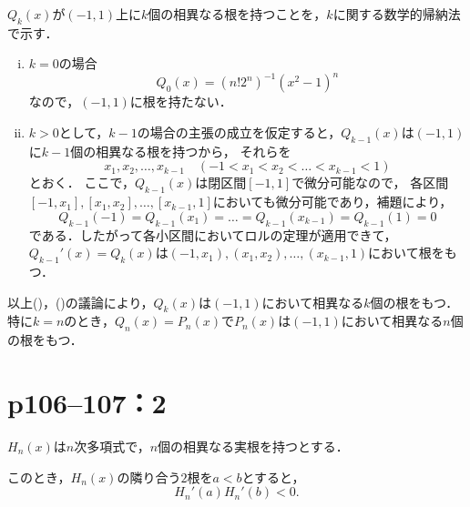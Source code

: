 \begin{tproof}
    $Q_k (x)$が$(-1,1)$上に$k$個の相異なる根を持つことを，$k$に関する数学的帰納法で示す．
    \begin{enumerate}[(i)]
        \item $k=0$の場合
              \[
                  Q_0(x)= (n! 2^n)^{-1} (x^2-1)^n
              \]
              なので，$(-1,1)$に根を持たない．
        \item $k>0$として，$k-1$の場合の主張の成立を仮定すると，$Q_{k-1}(x)$は$(-1,1)$に$k-1$個の相異なる根を持つから，
              それらを
              \[
                  x_1,x_2,\dots,x_{k-1}\quad (-1<x_1<x_2<\dots <x_{k-1}<1)
              \]とおく．
              ここで，$Q_{k-1} (x)$は閉区間$[-1,1]$で微分可能なので，
              各区間$[-1,x_1],[x_1,x_2],\dots,[x_{k-1},1]$においても微分可能であり，補題により，
              \[
                  Q_{k-1} (-1) = Q_{k-1}(x_1)=\dots = Q_{k-1}(x_{k-1})=Q_{k-1}(1)=0
              \]
              である．したがって各小区間においてロルの定理が適用できて，$Q_{k-1}' (x)=Q_k(x)$は$(-1,x_1),(x_1,x_2),\dots,(x_{k-1},1)$において根をもつ．
    \end{enumerate}
    以上()，()の議論により，$Q_k (x)$は$(-1,1)$において相異なる$k$個の根をもつ．
    特に$k=n$のとき，$Q_n (x)=P_n(x)$で$P_n (x)$は$(-1,1)$において相異なる$n$個の根をもつ．
\end{tproof}



\section*{p106--107：2}


\begin{lemma}{}{}
    $H_n(x)$は$n$次多項式で，$n$個の相異なる実根を持つとする．

    このとき，$H_n (x)$の隣り合う$2$根を$a < b$とすると，
    \[
        H_n'(a) H_n'(b)<0.
    \]
\end{lemma}


